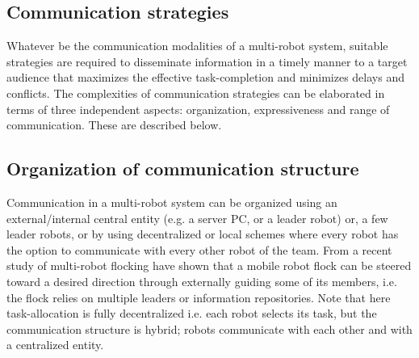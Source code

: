 \documentclass{intech}
\begin{document}
\subsection{Communication strategies}
Whatever be the communication modalities of a multi-robot system, suitable strategies are required to disseminate information in a timely manner to a target audience that maximizes the effective task-completion and minimizes delays and conflicts. The complexities of communication strategies can be elaborated in terms of three independent aspects: organization, expressiveness and range of communication. These are described below.
\subsection*{Organization of communication structure}
Communication in a multi-robot system can be organized using an external/internal central entity (e.g. a server PC, or a leader robot) or, a few leader robots, or by using decentralized or local schemes where every robot has the option to communicate with every other robot of the team. From a recent study of multi-robot flocking \cite{Celikkanat+2008} have shown that a mobile robot flock can be steered toward a desired direction through externally guiding some of its members, i.e. the flock relies on multiple leaders or information repositories. Note that here task-allocation is fully decentralized i.e. each robot selects its task, but the communication structure is hybrid; robots communicate with each other and with a centralized entity.
\end{document}
